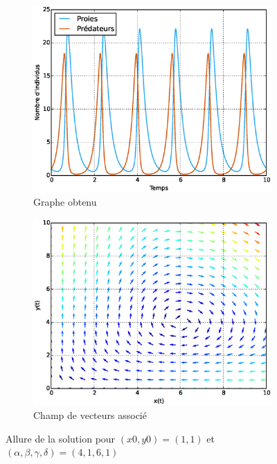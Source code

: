 \documentclass[11pt]{article}
\begin{document}
\begin{figure}[!ht]
    \begin{subfigure}{0.49\textwidth}
        \includegraphics[width=\linewidth]{diagramme_lv.eps} 
        \caption{Graphe obtenu}
    \end{subfigure}
    \begin{subfigure}{0.49\textwidth}
        \includegraphics[width=\linewidth]{champ_vecteur.eps}
        \caption{Champ de vecteurs associé}
    \end{subfigure}
     
    \caption{Allure de la solution pour $(x0, y0) = (1, 1)$ et $(\alpha, \beta, \gamma, \delta) = (4, 1, 6, 1)$}
    \label{fig:solution}
\end{figure}
\end{document}
